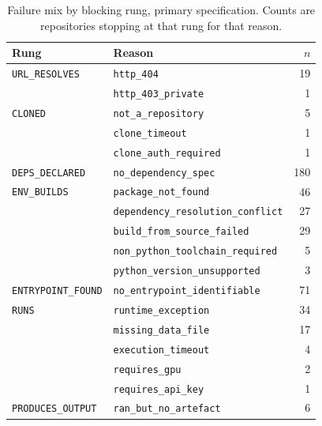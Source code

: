 \begin{table}[H]
\centering
\caption{Failure mix by blocking rung, primary specification. Counts are
repositories stopping at that rung for that reason.}
\label{tab:failure_mix}
\small
\begin{tabular}{@{}llr@{}}
\toprule
Rung & Reason & $n$ \\
\midrule
\texttt{URL\_RESOLVES}     & \texttt{http\_404}                       & 19 \\
                           & \texttt{http\_403\_private}              & 1 \\
\midrule
\texttt{CLONED}            & \texttt{not\_a\_repository}              & 5 \\
                           & \texttt{clone\_timeout}                  & 1 \\
                           & \texttt{clone\_auth\_required}           & 1 \\
\midrule
\texttt{DEPS\_DECLARED}    & \texttt{no\_dependency\_spec}            & 180 \\
\midrule
\texttt{ENV\_BUILDS}       & \texttt{package\_not\_found}             & 46 \\
                           & \texttt{dependency\_resolution\_conflict}& 27 \\
                           & \texttt{build\_from\_source\_failed}     & 29 \\
                           & \texttt{non\_python\_toolchain\_required}& 5 \\
                           & \texttt{python\_version\_unsupported}    & 3 \\
\midrule
\texttt{ENTRYPOINT\_FOUND} & \texttt{no\_entrypoint\_identifiable}    & 71 \\
\midrule
\texttt{RUNS}              & \texttt{runtime\_exception}              & 34 \\
                           & \texttt{missing\_data\_file}             & 17 \\
                           & \texttt{execution\_timeout}              & 4 \\
                           & \texttt{requires\_gpu}                   & 2 \\
                           & \texttt{requires\_api\_key}              & 1 \\
\midrule
\texttt{PRODUCES\_OUTPUT}  & \texttt{ran\_but\_no\_artefact}          & 6 \\
\bottomrule
\end{tabular}
\end{table}

